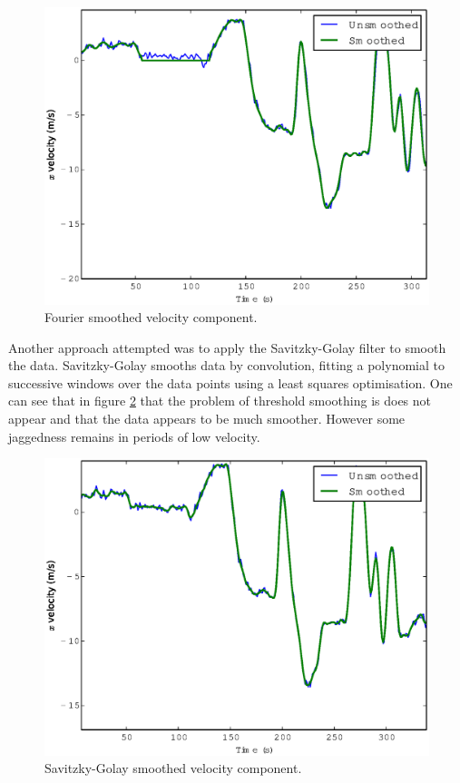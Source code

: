 \documentclass[a4paper, 11pt, twocolumn]{report}
\begin{document}
\begin{figure}[h]
    \center
    \includegraphics[width=\linewidth]{img/fouriersmooth}
    \caption{Fourier smoothed velocity component.}
    \label{fig:fouriersmooth}
\end{figure}

Another approach attempted was to apply the Savitzky-Golay filter to smooth the data.
Savitzky-Golay smooths data by convolution, fitting a polynomial to successive windows over the data points using a least squares optimisation.
One can see that in figure \ref{fig:savgolsmooth} that the problem of threshold smoothing is does not appear and that the data appears to be much smoother.
However some jaggedness remains in periods of low velocity.

\begin{figure}[h]
    \center
    \includegraphics[width=\linewidth]{img/savgolsmooth}
    \caption{Savitzky-Golay smoothed velocity component.}
    \label{fig:savgolsmooth}
\end{figure}
\end{document}
